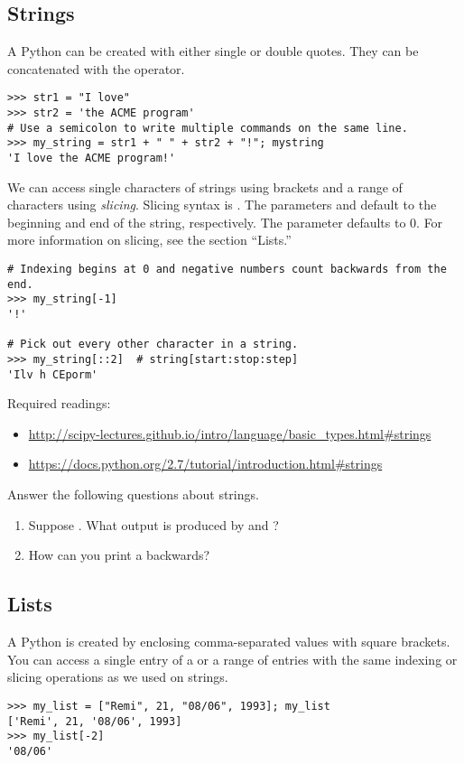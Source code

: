 \subsection*{Strings}
A Python  can be created with either single or double quotes. They can be concatenated with the \li{+} operator.
\begin{lstlisting}
>>> str1 = "I love"
>>> str2 = 'the ACME program'
# Use a semicolon to write multiple commands on the same line.
>>> my_string = str1 + " " + str2 + "!"; mystring
'I love the ACME program!'
\end{lstlisting}

We can access single characters of strings using brackets and a range of characters using \emph{slicing}. Slicing syntax is . The parameters  and  default to the beginning and end of the string, respectively. The parameter  defaults to 0. For more information on slicing, see the section ``Lists.''

\begin{lstlisting}
# Indexing begins at 0 and negative numbers count backwards from the end.
>>> my_string[-1]
'!'

# Pick out every other character in a string.
>>> my_string[::2]	# string[start:stop:step]
'Ilv h CEporm'
\end{lstlisting}

Required readings: 
\begin{itemize}
\item \url{http://scipy-lectures.github.io/intro/language/basic_types.html#strings}
\item \url{https://docs.python.org/2.7/tutorial/introduction.html#strings}
\end{itemize}

\begin{problem}
Answer the following questions about strings.
\begin{enumerate}
\item Suppose . What output is produced by  and ? 
\item How can you print a  backwards?
\end{enumerate}
\end{problem}


\subsection*{Lists}
A Python  is created by enclosing comma-separated values with square brackets. You can access a single entry of a  or a range of entries with the same indexing or slicing operations as we used on strings. 
\begin{lstlisting}
>>> my_list = ["Remi", 21, "08/06", 1993]; my_list
['Remi', 21, '08/06', 1993]
>>> my_list[-2]
'08/06'
\end{lstlisting}

